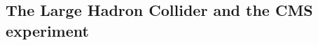 \begin{tcolorbox}[breakable,colback=black!5!white,colframe=red!80!black,width=\textwidth]
\chapter{The Large Hadron Collider and the CMS experiment}
\end{tcolorbox}
\label{chap:LHC_CMS}


\clearpage

